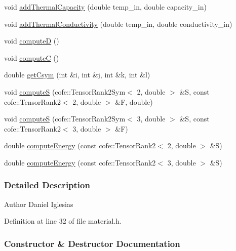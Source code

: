 \begin{DoxyCompactItemize}
\item 
void \hyperlink{classmknix_1_1_material_a10d83103594faee3cafc800585b7ab84}{add\+Thermal\+Capacity} (double temp\+\_\+in, double capacity\+\_\+in)
\item 
void \hyperlink{classmknix_1_1_material_a6fdcdf0ec301eefc568ac2e0b5cfce9e}{add\+Thermal\+Conductivity} (double temp\+\_\+in, double conductivity\+\_\+in)
\item 
void \hyperlink{classmknix_1_1_material_a134d81df672beb86b49b23dc0ac8cfe7}{compute\+D} ()
\item 
void \hyperlink{classmknix_1_1_material_a30503f7c95cd5f7410836224b9e66c19}{compute\+C} ()
\item 
double \hyperlink{classmknix_1_1_material_a457fa23b27193eb7b05f28cce48815c9}{get\+Csym} (int \&i, int \&j, int \&k, int \&l)
\item 
void \hyperlink{classmknix_1_1_material_ad7776950a550d384c1a00bd4c33bab2a}{compute\+S} (cofe\+::\+Tensor\+Rank2\+Sym$<$ 2, double $>$ \&S, const cofe\+::\+Tensor\+Rank2$<$ 2, double $>$ \&F, double)
\item 
void \hyperlink{classmknix_1_1_material_a837495b42050514f0c22513a05d438d8}{compute\+S} (cofe\+::\+Tensor\+Rank2\+Sym$<$ 3, double $>$ \&S, const cofe\+::\+Tensor\+Rank2$<$ 3, double $>$ \&F)
\item 
double \hyperlink{classmknix_1_1_material_a682b5ff79b4e899acb8d691aa01609c6}{compute\+Energy} (const cofe\+::\+Tensor\+Rank2$<$ 2, double $>$ \&S)
\item 
double \hyperlink{classmknix_1_1_material_a9183dec8b227f1a4ff6c45948a1523f8}{compute\+Energy} (const cofe\+::\+Tensor\+Rank2$<$ 3, double $>$ \&S)
\end{DoxyCompactItemize}


\subsubsection{Detailed Description}
\begin{DoxyAuthor}{Author}
Daniel Iglesias 
\end{DoxyAuthor}


Definition at line 32 of file material.\+h.



\subsubsection{Constructor \& Destructor Documentation}
\hypertarget{classmknix_1_1_material_a6bfec89c033e42c81479ffeb2cfca33b}{}
